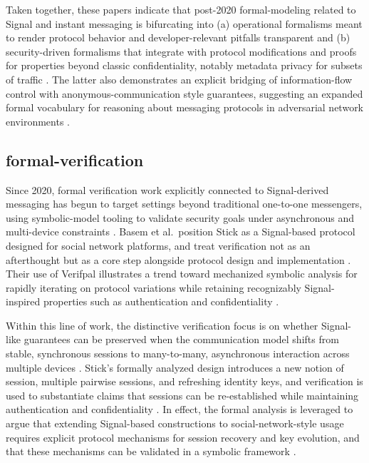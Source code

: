 Taken together, these papers indicate that post-2020 formal-modeling related to Signal and instant messaging is bifurcating into (a) operational formalisms meant to render protocol behavior and developer-relevant pitfalls transparent and (b) security-driven formalisms that integrate with protocol modifications and proofs for properties beyond classic confidentiality, notably metadata privacy for subsets of traffic \cite{vladimirovich2020,nelson2024}. The latter also demonstrates an explicit bridging of information-flow control with anonymous-communication style guarantees, suggesting an expanded formal vocabulary for reasoning about messaging protocols in adversarial network environments \cite{nelson2024}.

\subsection{formal-verification}
Since 2020, formal verification work explicitly connected to Signal-derived messaging has begun to target settings beyond traditional one-to-one messengers, using symbolic-model tooling to validate security goals under asynchronous and multi-device constraints \cite{basem2023}. Basem et al.\ position Stick as a Signal-based protocol designed for social network platforms, and treat verification not as an afterthought but as a core step alongside protocol design and implementation \cite{basem2023}. Their use of Verifpal illustrates a trend toward mechanized symbolic analysis for rapidly iterating on protocol variations while retaining recognizably Signal-inspired properties such as authentication and confidentiality \cite{basem2023}.

Within this line of work, the distinctive verification focus is on whether Signal-like guarantees can be preserved when the communication model shifts from stable, synchronous sessions to many-to-many, asynchronous interaction across multiple devices \cite{basem2023}. Stick’s formally analyzed design introduces a new notion of session, multiple pairwise sessions, and refreshing identity keys, and verification is used to substantiate claims that sessions can be re-established while maintaining authentication and confidentiality \cite{basem2023}. In effect, the formal analysis is leveraged to argue that extending Signal-based constructions to social-network-style usage requires explicit protocol mechanisms for session recovery and key evolution, and that these mechanisms can be validated in a symbolic framework \cite{basem2023}.

